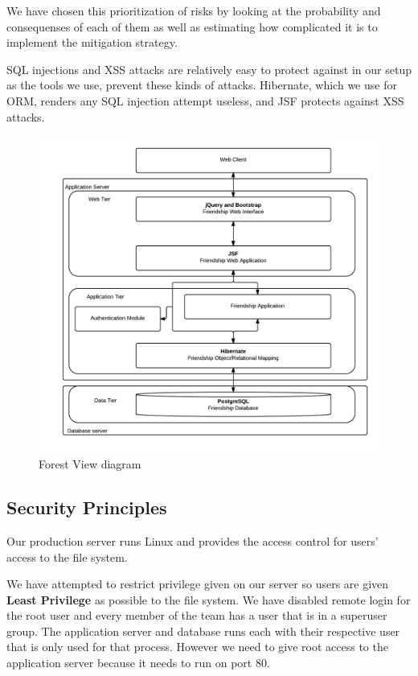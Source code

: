 \documentclass[a4paper]{article}
\begin{document}
We have chosen this prioritization of risks by looking at the probability and consequenses of each of them as well as estimating how complicated it is to implement the mitigation strategy.

SQL injections and XSS attacks are relatively easy to protect against in our setup as the tools we use, prevent these kinds of attacks. Hibernate, which we use for ORM, renders any SQL injection attempt useless, and JSF protects against XSS attacks.

\begin{figure}[h!]
\centering
\includegraphics[scale=0.3]{ForestView}
\caption{Forest View diagram}
\label{fig:forest_view}
\end{figure}

\subsection{Security Principles}

Our production server runs Linux and provides the access control for users' access to the file system.

We have attempted to restrict privilege given on our server so users are given 
\textbf{Least Privilege} as possible to the file system. We have disabled remote login for the root user and every member of the team has a user that is in a superuser group. The application server and database runs each with their respective user that is only used for that process. However we need to give root access to the application server because it needs to run on port 80.
\end{document}
